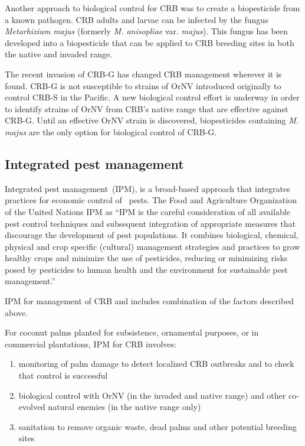\documentclass[twocolumn,letterpaper]{scrartcl}
\begin{document}
Another approach to biological control for CRB was to create a biopesticide from a known pathogen. CRB adults and larvae can be infected by the fungus \textit{Metarhizium majus} (formerly \textit{M. anisopliae} var. \textit{majus}). This fungus has been developed into 
a biopesticide that can be applied to CRB breeding sites in both the native and invaded range. 

The recent invasion of CRB-G has changed CRB management wherever it is found. CRB-G is not susceptible to strains of OrNV introduced originally to control CRB-S in the Pacific. A new biological control effort is underway in order to identify strains of OrNV from CRB’s native range that are effective against CRB-G. Until an effective OrNV strain is discovered, biopesticides containing \textit{M. majus} are the only option for biological control of CRB-G. 

\subsection{Integrated pest management}

Integrated pest management (IPM), is a broad-based approach that integrates practices for economic control of  pests.  The  Food and Agriculture Organization of the United Nations   IPM  as  “IPM is the careful consideration of all available pest control techniques and subsequent integration of appropriate measures that discourage the development of pest populations. It combines biological, chemical, physical and crop specific (cultural) management strategies and practices to grow healthy crops and minimize the use of pesticides, reducing or minimizing risks posed by pesticides to human health and the environment for sustainable pest management.”

IPM for management of CRB and includes combination of the factors described above. 

For coconut palms planted for subsistence, ornamental purposes, or in commercial plantations, IPM for CRB involves: 
\begin{enumerate}
\item monitoring of palm damage to detect localized CRB outbreaks and to check that control is successful
\item biological control with OrNV (in the invaded and native range) and other co-evolved natural enemies (in the native range only)
\item sanitation to remove organic waste, dead palms and  other  potential  breeding  sites
\end{enumerate}
\end{document}
